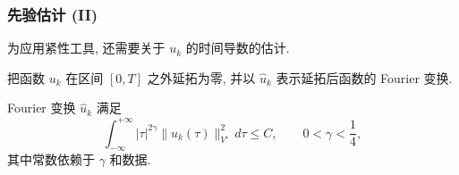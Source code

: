 \subsubsection{先验估计 (II)}
\label{subsubsec:ch3-projection-apriori-two}

为应用紧性工具, 还需要关于 $u_k$ 的时间导数的估计.

把函数 $u_k$ 在区间 $[0,T]$ 之外延拓为零, 并以 $\widehat u_k$ 表示延拓后函数的 Fourier 变换.

\begin{Lemma}
\label{lem:ch3-projection-fourier-bound}
Fourier 变换 $\widehat u_k$ 满足
\begin{equation}
\int_{-\infty}^{+\infty}|\tau|^{2\gamma}
\lVert\widehat u_k(\tau)\rVert_{V'}^2\,d\tau
\leq C,\qquad 0<\gamma<\frac14,
\label{eq:ch3-projection-fourier-bound}
\end{equation}
其中常数依赖于 $\gamma$ 和数据.
\end{Lemma}
\hypertarget{chapter-03-page-287}{}
